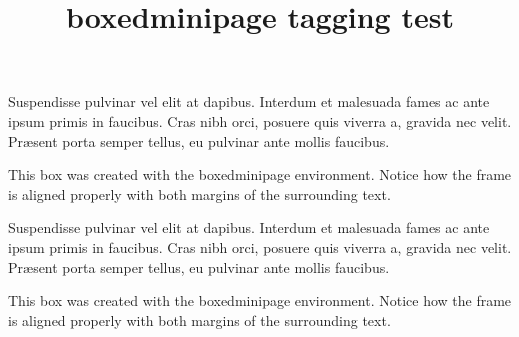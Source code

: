 \documentclass{article}
\title{boxedminipage tagging test}
\begin{document}
Suspendisse pulvinar vel elit at dapibus. Interdum et malesuada
fames ac ante ipsum primis in faucibus. Cras nibh orci, posuere
quis viverra a, gravida nec velit. Pr\ae{}sent porta semper
tellus, eu pulvinar ante mollis faucibus.

\noindent
\begin{boxedminipage}[t]{\linewidth}
This box was created with the boxedminipage environment.
Notice how the frame is aligned properly with both margins of
the surrounding text.
\end{boxedminipage}

Suspendisse pulvinar vel elit at dapibus. Interdum et malesuada
fames ac ante ipsum primis in faucibus. Cras nibh orci, posuere
quis viverra a, gravida nec velit. Pr\ae{}sent porta semper
tellus, eu pulvinar ante mollis faucibus.

\noindent
\begin{minipage}[t]{\linewidth}
This box was created with the boxedminipage environment.
Notice how the frame is aligned properly with both margins of
the surrounding text.
\end{minipage}
\end{document}
